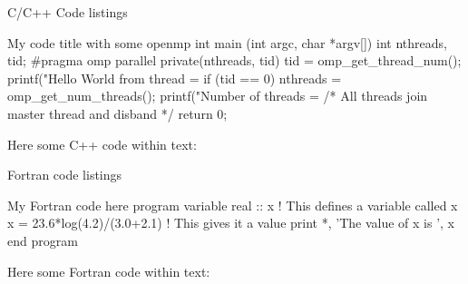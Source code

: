 \documentclass[aspectratio=1610]{beamer}
\begin{document}
\begin{frame}[fragile]{C/C++ Code listings}
\begin{Cpplisting}{My code title with some openmp}
int main (int argc, char *argv[]) {
    int nthreads, tid;
    #pragma omp parallel private(nthreads, tid)
    {
        tid = omp_get_thread_num();
        printf("Hello World from thread = %
        if (tid == 0) {
            nthreads = omp_get_num_threads();
            printf("Number of threads = %
        }
    }  /* All threads join master thread and disband */
    return 0;
}
\end{Cpplisting}
Here some C++ code within text: 
\end{frame}

\begin{frame}[fragile]{Fortran code listings}
\begin{Fortranlisting}{My Fortran code here}
program variable
real :: x ! This defines a variable called x
x = 23.6*log(4.2)/(3.0+2.1) ! This gives it a value
print *, 'The value of x is ', x 
end program
\end{Fortranlisting}
Here some Fortran code within text: 
\end{frame}

\end{document}
